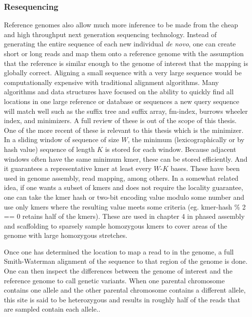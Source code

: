 \subsubsection{Resequencing}

\par{
Reference genomes also allow much more inference to be made from the cheap and high throughput next generation sequencing technology. Instead of generating the entire sequence of each new individual \textit{de novo}, one can create short or long reads and map them onto a reference genome with the assumption that the reference is similar enough to the genome of interest that the mapping is globally correct. Aligning a small sequence with a very large sequence would be computationally expensive with traditional alignment algorithms\cite{smithwaterman}\cite{needlemanwunsch}. Many algorithms and data structures have focused on the ability to quickly find all locations in one large reference or database or sequences a new query sequence will match well such as the suffix tree and suffix array, fm-index, burrows wheeler index, and minimizers. A full review of these is out of the scope of this thesis\cite{suffixarray}\cite{suffixtree}\cite{fmindex}\cite{fmindex2}\cite{bwa}\cite{blat}. One of the more recent of these is relevant to this thesis which is the minimizer. In a sliding window of sequence of size $W$, the minimum (lexicographically or by hash value) sequence of length $K$ is stored for each window\cite{minimizers}. Because adjacent windows often have the same minimum kmer, these can be stored efficiently. And it guarantees a representative kmer at least every $W$-$K$ bases. These have been used in genome assembly, read mapping, among others\cite{LSH}\cite{minimap2}\cite{mashmap}. In a somewhat related idea, if one wants a subset of kmers and does not require the locality guarantee, one can take the kmer hash or two-bit encoding value modulo some number and use only kmers where the resulting value meets some criteria (eg. kmer-hash \% 2 == 0 retains half of the kmers)\cite{modimizer}. These are used in chapter 4 in phased assembly and scaffolding to sparsely sample homozygous kmers to cover areas of the genome with large homozygous stretches. 
} 

\par{
Once one has determined the location to map a read to in the genome, a full Smith-Waterman alignment of the sequence to that region of the genome is done\cite{smithwaterman}. One can then inspect the differences between the genome of interest and the reference genome to call genetic variants. When one parental chromosome contains one allele and the other parental chromosome contains a different allele, this site is said to be heterozygous and results in roughly half of the reads that are sampled contain each allele.\cite{freebayes}\cite{gatk}.
}

